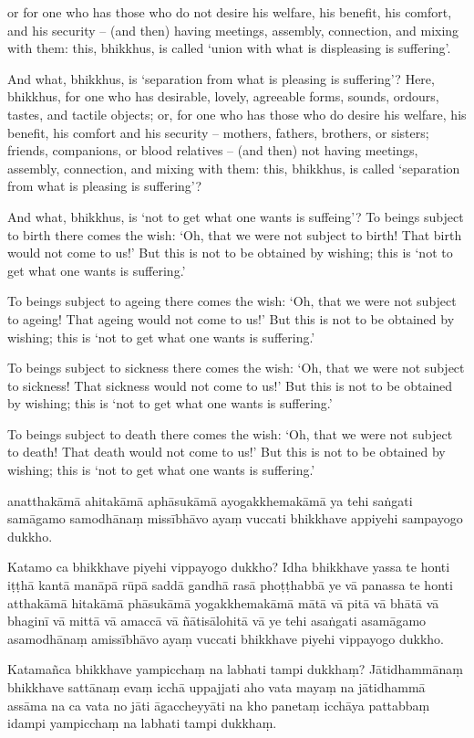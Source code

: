 or for one who has those who do not desire his welfare, his benefit, his
comfort, and his security -- (and then) having meetings, assembly, connection,
and mixing with them: this, bhikkhus, is called `union with what is displeasing
is suffering'.

And what, bhikkhus, is `separation from what is pleasing is suffering'? Here,
bhikkhus, for one who has desirable, lovely, agreeable forms, sounds, ordours,
tastes, and tactile objects; or, for one who has those who do desire his
welfare, his benefit, his comfort and his security -- mothers, fathers,
brothers, or sisters; friends, companions, or blood relatives -- (and then) not
having meetings, assembly, connection, and mixing with them: this, bhikkhus, is
called `separation from what is pleasing is suffering'?

And what, bhikkhus, is `not to get what one wants is suffeing'? To beings
subject to birth there comes the wish: `Oh, that we were not subject to birth!
That birth would not come to us!' But this is not to be obtained by wishing;
this is `not to get what one wants is suffering.'

To beings subject to ageing there comes the wish: `Oh, that we were not subject
to ageing! That ageing would not come to us!' But this is not to be obtained by
wishing; this is `not to get what one wants is suffering.'

To beings subject to sickness there comes the wish: `Oh, that we were not
subject to sickness! That sickness would not come to us!' But this is not to be
obtained by wishing; this is `not to get what one wants is suffering.'

To beings subject to death there comes the wish: `Oh, that we were not subject
to death! That death would not come to us!' But this is not to be obtained by
wishing; this is `not to get what one wants is suffering.'

\paliPage

anatthakāmā ahitakāmā aphāsukāmā ayogakkhemakāmā ya tehi saṅgati samāgamo
samodhānaṃ missībhāvo ayaṃ vuccati bhikkhave appiyehi sampayogo dukkho.

Katamo ca bhikkhave piyehi vippayogo dukkho? Idha bhikkhave yassa te honti iṭṭhā
kantā manāpā rūpā saddā gandhā rasā phoṭṭhabbā ye vā panassa te honti atthakāmā
hitakāmā phāsukāmā yogakkhemakāmā mātā vā pitā vā bhātā vā bhaginī vā mittā vā
amaccā vā ñātisālohitā vā ye tehi asaṅgati asamāgamo asamodhānaṃ amissībhāvo
ayaṃ vuccati bhikkhave piyehi vippayogo dukkho.

Katamañca bhikkhave yampicchaṃ na labhati tampi dukkhaṃ? Jātidhammānaṃ bhikkhave
sattānaṃ evaṃ icchā uppajjati aho vata mayaṃ na jātidhammā assāma na ca vata no
jāti āgaccheyyāti na kho panetaṃ icchāya pattabbaṃ idampi yampicchaṃ na labhati
tampi dukkhaṃ.

